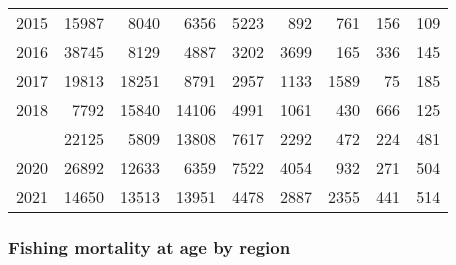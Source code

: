 \documentclass[
]{article}
\begin{document}
\begin{longtable}[t]{lrrrrrrrr}
2015 & 15987 & 8040 & 6356 & 5223 & 892 & 761 & 156 & 109\\
2016 & 38745 & 8129 & 4887 & 3202 & 3699 & 165 & 336 & 145\\
2017 & 19813 & 18251 & 8791 & 2957 & 1133 & 1589 & 75 & 185\\
2018 & 7792 & 15840 & 14106 & 4991 & 1061 & 430 & 666 & 125\\
\addlinespace
2019 & 22125 & 5809 & 13808 & 7617 & 2292 & 472 & 224 & 481\\
2020 & 26892 & 12633 & 6359 & 7522 & 4054 & 932 & 271 & 504\\
2021 & 14650 & 13513 & 13951 & 4478 & 2887 & 2355 & 441 & 514\\*
\end{longtable}

\hypertarget{fishing-mortality-at-age-by-region}{%
\subsubsection{Fishing mortality at age by
region}\label{fishing-mortality-at-age-by-region}}
\end{document}
